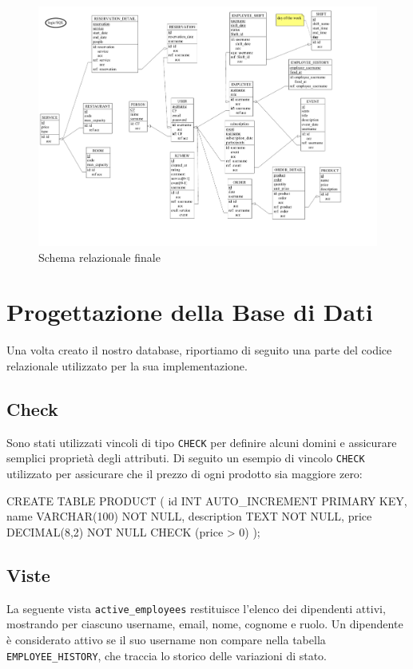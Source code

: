 \documentclass[a4paper,12pt]{report}
\begin{document}
\begin{figure}[H]
  \centering
  \includegraphics[width=\textwidth, trim=0 0 0 0]{./schemas/logic.pdf}
  \caption{Schema relazionale finale}
  \label{fig:schema-relazione}
\end{figure}
\newpage

\chapter{Progettazione della Base di Dati}
Una volta creato il nostro database, riportiamo di seguito una parte
del codice relazionale
utilizzato per la sua implementazione.

\section{Check}
Sono stati utilizzati vincoli di tipo \texttt{CHECK} per definire
alcuni domini e assicurare
semplici proprietà degli attributi. Di seguito un esempio di vincolo
\texttt{CHECK} utilizzato
per assicurare che il prezzo di ogni prodotto sia maggiore zero:

\begin{sqlcode}[caption={},label={lst:check}]
CREATE TABLE PRODUCT (
    id INT AUTO_INCREMENT PRIMARY KEY,
    name VARCHAR(100) NOT NULL,
    description TEXT NOT NULL,
    price DECIMAL(8,2) NOT NULL CHECK (price > 0)
);
\end{sqlcode}

\section{Viste}
La seguente vista \texttt{active\_employees} restituisce l'elenco dei
dipendenti attivi,
mostrando per ciascuno username, email, nome, cognome e ruolo. Un
dipendente è considerato
attivo se il suo username non compare nella tabella
\texttt{EMPLOYEE\_HISTORY}, che traccia
lo storico delle variazioni di stato.
\end{document}
